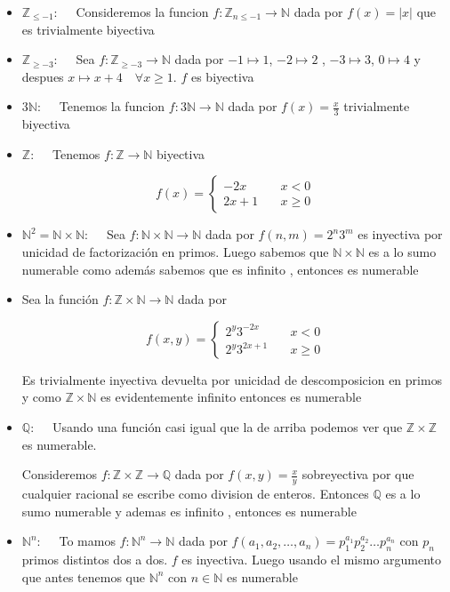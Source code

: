 \documentclass[12pt]{article}
\newcommand{\Q}{\mathbb{Q}}
\newcommand{\Z}{\mathbb{Z}}
\newcommand{\N}{\mathbb{N}}
\newcommand{\ra}{\rightarrow}
\theoremstyle{definition}
\begin{document}
\begin{itemize}
  \item $\Z_{\leq -1}: \quad$ Consideremos la funcion $f : \Z_{n \leq -1} \ra \N$ dada por $f(x) = |x|$ que es trivialmente biyectiva

  \item $\Z_{\geq -3}: \quad$ Sea $f: \Z_{\geq -3} \ra \N$ dada por $-1 \mapsto 1$, $-2 \mapsto 2$ , $-3 \mapsto 3$, $0 \mapsto 4$ y despues $x \mapsto x + 4 \quad \forall x \geq 1$. $f$ es biyectiva

  \item $3 \N: \quad$ Tenemos la funcion $f:3 \N \ra \N$ dada por $f(x) = \frac{x}{3}$ trivialmente biyectiva
  
  \item $\Z: \quad $ Tenemos $f: \Z \ra \N$ biyectiva

$$
f(x) = \left\{
        \begin{array}{ll}
	  -2x  & \quad x < 0 \\
	2x +1  & \quad x \geq 0 
        \end{array}
    \right.
$$

\item $\N^{2} = \N \times \N: \quad$ Sea $f : \N \times \N \ra \N$ dada por $f(n,m) =2^n3^m$ es inyectiva por unicidad de  factorización en primos. Luego sabemos que $\N \times \N$ es a lo sumo numerable como además sabemos que es infinito , entonces es numerable

\item  Sea la función $f: \Z \times \N \ra \N$ dada por 

$$
f(x,y) = \left\{
        \begin{array}{ll}
	  2^{y}3^{-2x}  & \quad x < 0 \\
	  2^{y}3^{2x + 1}  & \quad x \geq 0 
        \end{array}
    \right.
$$

Es trivialmente inyectiva devuelta por unicidad de descomposicion en primos y como $\Z \times \N$ es evidentemente infinito entonces es numerable
  
\item $\Q: \quad $ Usando una función casi igual que la de arriba podemos ver que $ \Z \times \Z $ es numerable.

  Consideremos $f: \Z \times \Z \ra \Q$ dada por $f(x,y) = \frac{x}{y}$ sobreyectiva por que cualquier racional se escribe como division de enteros. Entonces $\Q$ es a lo sumo numerable y ademas es infinito , entonces es numerable
  
 \item $\N^{n}: \quad$ To mamos $f: \N^{n} \ra \N$ dada por $f(a_{1},a_{2}, \dots , a_{n}) = p_{1}^{a_{1}}p_{2}^{a_{2}} \dots p_{n}^{a_{n}}$  con $p_{n}$ primos distintos dos a dos. $f$ es inyectiva. Luego usando el mismo argumento que antes tenemos que $\N^n$ con $n \in \N$ es numerable \\
\end{itemize}
\end{document}
